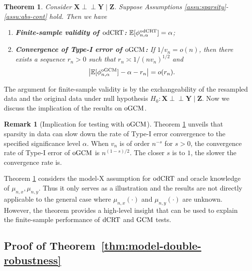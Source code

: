 \documentclass[12pt]{article}
\newtheorem{theorem}{Theorem}
\theoremstyle{definition}
\newtheorem{remark}{Remark}
\newcommand{\indep}{\perp \!\!\! \perp}
\newcommand{\E}{\mathbb E}								%
\newcommand{\prx}{\bm X}								%
\newcommand{\prz}{\bm Z}								%
\newcommand{\pry}{{\bm Y}}								%
\newcommand{\dCRT}{\textnormal{dCRT}} 					%
\newcommand{\odCRT}{\textnormal{odCRT}} 					%
\newcommand{\GCM}{\textnormal{GCM}}						%
\newcommand{\oGCM}{\textnormal{oGCM}}						%
\begin{document}
\begin{theorem}\label{thm:illustrative}
  Consider $\prx\indep\pry\mid \prz$. Suppose Assumptions \ref{assu:sparsity}-\ref{assu:abs-cont} hold. Then we have
  \begin{enumerate}
	\item \textbf{Finite-sample validity of $\odCRT$:} $\E[\phi_{n,\alpha}^{\odCRT}]=\alpha$;
	\item \textbf{Convergence of Type-I error of $\oGCM$:} If $1/v_n=o(n)$, then there exists a sequence $r_n>0$ such that $r_n\asymp 1/(nv_n)^{1/2}$ and
	\begin{align}\label{eq:illustrative-convergence}
	  \left|\E[\phi_{n,\alpha}^{\oGCM}]-\alpha-r_n\right|=o(r_n).
	\end{align}
  \end{enumerate}
\end{theorem}
The argument for finite-sample validity is by the exchangeability of the resampled data and the original data under null hypothesis $H_0:\prx\indep\pry\mid \prz$. Now we discuss the implication of the results on $\oGCM$.
\begin{remark}[Implication for testing with $\oGCM$]
	Theorem \ref{thm:illustrative} unveils that sparsity in data can slow down the rate of Type-I error convergence to the specified significance level $\alpha$. When $v_n$ is of order $n^{-s}$ for $s>0$, the convergence rate of Type-I error of $\oGCM$ is $n^{(1-s)/2}$. The closer $s$ is to $1$, the slower the convergence rate is. 
\end{remark}

Theorem \ref{thm:illustrative} considers the model-X assumption for $\odCRT$ and oracle knowledge of $\mu_{n,x},\mu_{n,y}$. Thus it only serves as a illustration and the results are not directly applicable to the general case where $\mu_{n,x}(\cdot)$ and $\mu_{n,y}(\cdot)$ are unknown. However, the theorem provides a high-level insight that can be used to explain the finite-sample performance of $\dCRT$ and $\GCM$ tests. 


\subsection{Proof of Theorem~\ref{thm:model-double-robustness}}\label{sec:proof-model-double-robustness}
\end{document}
